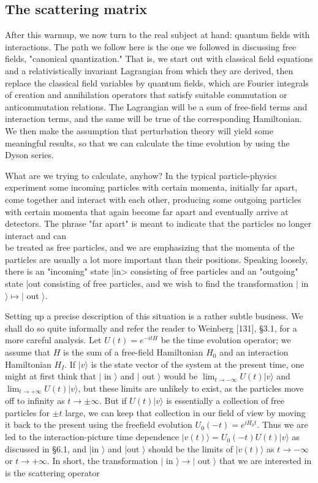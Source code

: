 \documentclass[10pt, letterpaper]{article}
\begin{document}
\subsection*{The scattering matrix}
After this warmup, we now turn to the real subject at hand: quantum fields with interactions. The path we follow here is the one we followed in discussing free fields, "canonical quantization." That is, we start out with classical field equations and a relativistically invariant Lagrangian from which they are derived, then replace the classical field variables by quantum fields, which are Fourier integrals of creation and annihilation operators that satisfy suitable commutation or anticommutation relations. The Lagrangian will be a sum of free-field terms and interaction terms, and the same will be true of the corresponding Hamiltonian. We then make the assumption that perturbation theory will yield some meaningful results, so that we can calculate the time evolution by using the Dyson series.

What are we trying to calculate, anyhow? In the typical particle-physics experiment some incoming particles with certain momenta, initially far apart, come together and interact with each other, producing some outgoing particles with certain momenta that again become far apart and eventually arrive at detectors. The phrase "far apart" is meant to indicate that the particles no longer interact and can\\
be treated as free particles, and we are emphasizing that the momenta of the particles are usually a lot more important than their positions. Speaking loosely, there is an "incoming" state |in> consisting of free particles and an "outgoing" state |out consisting of free particles, and we wish to find the transformation $\mid$ in $\rangle \mapsto \mid$ out $\rangle$.

Setting up a precise description of this situation is a rather subtle business. We shall do so quite informally and refer the reader to Weinberg [131], §3.1, for a more careful analysis. Let $U(t)=e^{-i t H}$ be the time evolution operator; we assume that $H$ is the sum of a free-field Hamiltonian $H_{0}$ and an interaction Hamiltonian $H_{I}$. If $|v\rangle$ is the state vector of the system at the present time, one might at first think that $\mid$ in $\rangle$ and $\mid$ out $\rangle$ would be $\lim _{t \rightarrow-\infty} U(t)|v\rangle$ and $\lim _{t \rightarrow+\infty} U(t)|v\rangle$, but these limits are unlikely to exist, as the particles move off to infinity as $t \rightarrow \pm \infty$. But if $U(t)|v\rangle$ is essentially a collection of free particles for $\pm t$ large, we can keep that collection in our field of view by moving it back to the present using the freefield evolution $U_{0}(-t)=e^{i H_{0} t}$. Thus we are led to the interaction-picture time dependence $|v(t)\rangle=U_{0}(-t) U(t)|v\rangle$ as discussed in §6.1, and |in $\rangle$ and |out $\rangle$ should be the limits of $|v(t)\rangle$ as $t \rightarrow-\infty$ or $t \rightarrow+\infty$. In short, the transformation $\mid$ in $\rangle \rightarrow \mid$ out $\rangle$ that we are interested in is the scattering operator
\end{document}
